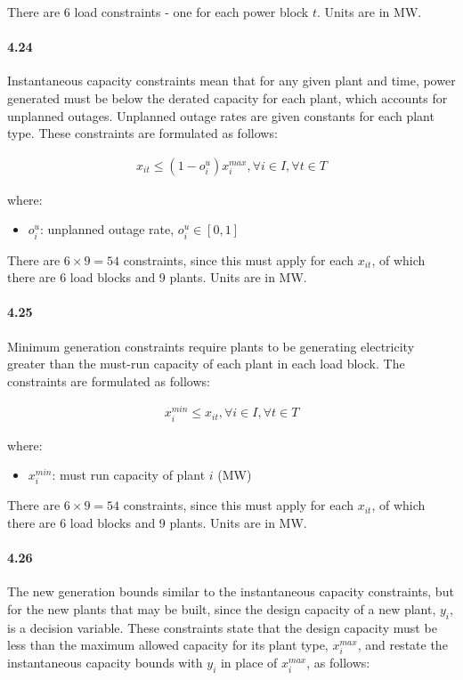 \documentclass{article}
\begin{document}
	There are 6 load constraints - one for each power block $t$. Units are in MW.
	
	
\paragraph{4.24}
	Instantaneous capacity constraints mean that for any given plant and time, power generated must be below the derated capacity for each plant, which accounts for unplanned outages. Unplanned outage rates are given constants for each plant type. These constraints are formulated as follows:
	
	\begin{align*}
		x_{it} \leq (1 - o_i^u) x_i^{max}, \forall i \in I, \forall t \in T
	\end{align*}
	
	where:
	\begin{itemize}
		\item $o_i^u$: unplanned outage rate, $o_i^u \in [0,1]$		
	\end{itemize}
	
	There are $6 \times 9 = 54$ constraints, since this must apply for each $x_{it}$, of which there are 6 load blocks and 9 plants. Units are in MW.


\paragraph{4.25}
	Minimum generation constraints require plants to be generating electricity greater than the must-run capacity of each plant in each load block. The constraints are formulated as follows:
	
	\begin{align*}
		x_i^{min} \leq x_{it}, \forall i \in I, \forall t \in T
	\end{align*}
	
	where:
	\begin{itemize}
		\item $x_i^{min}$: must run capacity of plant $i$ (MW)
	\end{itemize}
	
	There are $6 \times 9 = 54$ constraints, since this must apply for each $x_{it}$, of which there are 6 load blocks and 9 plants. Units are in MW.
	
	
\paragraph{4.26}
	The new generation bounds similar to the instantaneous capacity constraints, but for the new plants that may be built, since the design capacity of a new plant, $y_i$, is a decision variable. These constraints state that the design capacity must be less than the maximum allowed capacity for its plant type, $x_i^{max}$, and restate the instantaneous capacity bounds with $y_i$ in place of $x_i^{max}$, as follows:
	
\end{document}
